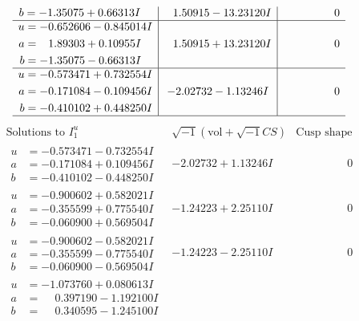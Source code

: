 \documentclass[1p]{elsarticle_modified}
\theoremstyle{definition}
\newcommand{\I}{\sqrt{-1}}
\begin{document}
$$\begin{array}{c|c|c}
\begin{aligned}
b &= -1.35075 + 0.66313 I\end{aligned}
 & \phantom{-}1.50915 - 13.23120 I & \phantom{-0.000000 } 0 \\ \hline\begin{aligned}
u &= -0.652606 - 0.845014 I \\
a &= \phantom{-}1.89303 + 0.10955 I \\
b &= -1.35075 - 0.66313 I\end{aligned}
 & \phantom{-}1.50915 + 13.23120 I & \phantom{-0.000000 } 0 \\ \hline\begin{aligned}
u &= -0.573471 + 0.732554 I \\
a &= -0.171084 - 0.109456 I \\
b &= -0.410102 + 0.448250 I\end{aligned}
 & -2.02732 - 1.13246 I & \phantom{-0.000000 } 0\\
 \hline 
 \end{array}$$\newpage$$\begin{array}{c|c|c}  
\text{Solutions to }I^u_{1}& \I (\text{vol} + \sqrt{-1}CS) & \text{Cusp shape}\\
 \hline 
\begin{aligned}
u &= -0.573471 - 0.732554 I \\
a &= -0.171084 + 0.109456 I \\
b &= -0.410102 - 0.448250 I\end{aligned}
 & -2.02732 + 1.13246 I & \phantom{-0.000000 } 0 \\ \hline\begin{aligned}
u &= -0.900602 + 0.582021 I \\
a &= -0.355599 + 0.775540 I \\
b &= -0.060900 + 0.569504 I\end{aligned}
 & -1.24223 + 2.25110 I & \phantom{-0.000000 } 0 \\ \hline\begin{aligned}
u &= -0.900602 - 0.582021 I \\
a &= -0.355599 - 0.775540 I \\
b &= -0.060900 - 0.569504 I\end{aligned}
 & -1.24223 - 2.25110 I & \phantom{-0.000000 } 0 \\ \hline\begin{aligned}
u &= -1.073760 + 0.080613 I \\
a &= \phantom{-}0.397190 - 1.192100 I \\
b &= \phantom{-}0.340595 - 1.245100 I\end{aligned}

\end{array}$$
\end{document}
